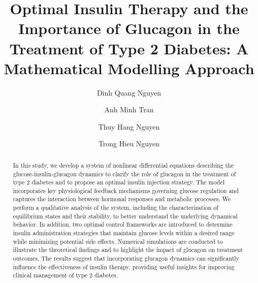 \documentclass[a4paper,fleqn]{cas-sc}
\numberwithin{equation}{section}
\numberwithin{equation}{section}
\newcommand{\1}{\boldsymbol{1}}
\newcommand{\0}{\boldsymbol{0}}
\begin{document}
\let\WriteBookmarks\relax
\def\floatpagepagefraction{1}
\def\textpagefraction{.001}

\title [mode = title]{Optimal Insulin Therapy and the Importance of Glucagon in the Treatment of  Type 2 Diabetes: A Mathematical Modelling Approach}

\author[hus]{Dinh Quang Nguyen}

\author[hus]{Anh Minh Tran}

\author[hos]{Thuy Hang Nguyen}


\author[hus]{Trong Hieu Nguyen}
\cormark[1]





\begin{abstract}
In this study, we develop a system of nonlinear differential equations describing the glucose-insulin-glucagon dynamics to clarify the role of glucagon in the treatment of type 2 diabetes and to propose an optimal insulin injection strategy. The model incorporates key physiological feedback mechanisms governing glucose regulation and captures the interaction between hormonal responses and metabolic processes. We perform a qualitative analysis of the system, including the characterization of equilibrium states and their stability, to better understand the underlying dynamical behavior. In addition, two optimal control frameworks are introduced to determine insulin administration strategies that maintain glucose levels within a desired range while minimizing potential side effects. Numerical simulations are conducted to illustrate the theoretical findings and to highlight the impact of glucagon on treatment outcomes. The results suggest that incorporating glucagon dynamics can significantly influence the effectiveness of insulin therapy, providing useful insights for improving clinical management of type 2 diabetes.
\end{abstract}
\end{document}
